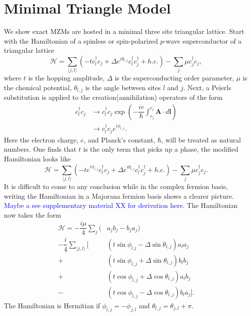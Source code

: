 \documentclass[aps,prb,showpacs,amsmath,amssymb,superscriptaddress]{revtex4-2}
\newcommand{\Blue}[1]{\textcolor{blue}{#1}}
\renewcommand{\vec}[1]{\mathbf{#1}}
\newcommand{\ham}{\mathcal{H}}
\newcommand{\cc}{c^{\dagger}}
\newcommand{\de}{\Delta}
\begin{document}
\section{Minimal Triangle Model}

We show exact MZMs are hosted in a minimal three site triangular lattice.
Start with the Hamiltonian of a spinless or spin-polarized $p$-wave superconductor of a triangular lattice
\begin{equation}
  \ham = \sum_{\langle j, l \rangle} (-t\cc_{l} c_j + \de e^{i\theta_{l,j}} \cc_{l}\cc_j + h.c.) - \sum_{j} \mu \cc_j c_j,
\end{equation}
where $t$ is the hopping amplitude, $\de$ is the superconducting order parameter, $\mu$ is the chemical potential, $\theta_{l,j}$ is the angle between sites $l$ and $j$.
Next, a Peierls substitution is applied to the creation(annihilation) operators of the form
\begin{align}
  \cc_{l} c_j &\rightarrow \cc_{l} c_j \exp \left(-\dfrac{i e}{\hbar} \int_{r_j}^{r_{l}} \vec{A} \cdot d\vec{l} \right) \\ \nonumber
  &\rightarrow \cc_{l} c_j e^{i \phi_{l,j}}.
\end{align}
Here the electron charge, $e$, and Planck's constant, $\hbar$, will be treated as natural numbers.
One finds that $t$ is the only term that picks up a phase, the modified Hamiltonian looks like
\begin{equation} \label{eq: Peierls Hamiltonian}
  \ham = \sum_{\langle j,l \rangle} (-t e^{i\phi_{l,j}} \cc_{l} c_j + \de e^{i\theta_{l,j}} \cc_{l}\cc_j + h.c.) - \sum_j \mu \cc_j c_j.
\end{equation}
It is difficult to come to any conclusion while in the complex fermion basis, writing the Hamiltonian in a Majorana fermion basis shows a clearer picture.
\Blue{Maybe a see supplementary material XX for derivation here.}
The Hamiltonian now takes the form
\begin{align}
  \ham = -\dfrac{i\mu}{4} \sum_j (& a_j b_j - b_j a_j) \nonumber \\
  -\dfrac{i}{4} \sum_{\langle j,l \rangle} [&(t\sin\phi_{l.j}-\de\sin\theta_{l,j}) a_l a_j \nonumber \\
  +&(t\sin\phi_{l,j}+\de\sin\theta_{l,j}) b_l b_j \nonumber \\
  +&(t\cos\phi_{l,j}+\de\cos\theta_{l,j}) a_l b_j \nonumber \\
  -&(t\cos\phi_{l,j}-\de\cos\theta_{l,j}) b_l a_j].
\end{align}
The Hamiltonian is Hermitian if $\phi_{l,j} = -\phi_{j,l}$ and $\theta_{l,j} = \theta_{j,l} + \pi$.
\end{document}
